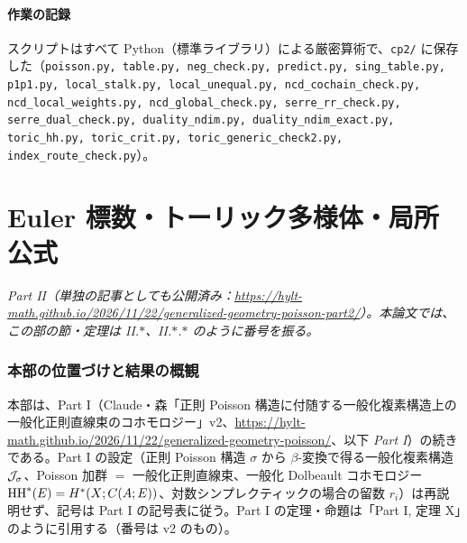 \subsection{作業の記録}
スクリプトはすべて Python（標準ライブラリ）による厳密算術で、\texttt{cp2/} に保存した（\texttt{poisson.py, table.py, neg\_check.py, predict.py, sing\_table.py, p1p1.py, local\_stalk.py, local\_unequal.py, ncd\_cochain\_check.py, ncd\_local\_weights.py, ncd\_global\_check.py, serre\_rr\_check.py, serre\_dual\_check.py, duality\_ndim.py, duality\_ndim\_exact.py, toric\_hh.py, toric\_crit.py, toric\_generic\_check2.py, index\_route\_check.py}）。

\clearpage
\part{Euler 標数・トーリック多様体・局所公式}
\setcounter{section}{0}
\noindent\textit{Part II（単独の記事としても公開済み：\url{https://hylt-math.github.io/2026/11/22/generalized-geometry-poisson-part2/}）。本論文では、この部の節・定理は II.$\ast$、II.$\ast$.$\ast$ のように番号を振る。}\par
\section{本部の位置づけと結果の概観}\label{p2:sec:intro}
本部は、Part I（Claude・森「正則 Poisson 構造に付随する一般化複素構造上の一般化正則直線束のコホモロジー」v2、\url{https://hylt-math.github.io/2026/11/22/generalized-geometry-poisson/}、以下 \emph{Part I}）の続きである。Part I の設定（正則 Poisson 構造 $\sigma$ から $\beta$-変換で得る一般化複素構造 $\mathcal J_\sigma$、Poisson 加群 $=$ 一般化正則直線束、一般化 Dolbeault コホモロジー $\mathrm{HH}^*(E)=H^*(X;C(A;E))$、対数シンプレクティックの場合の留数 $r_i$）は再説明せず、記号は Part I の記号表に従う。Part I の定理・命題は「Part I, 定理 X」のように引用する（番号は v2 のもの）。

